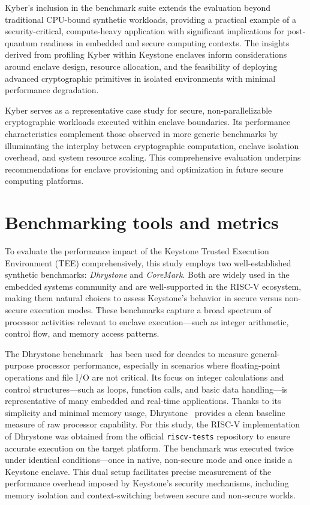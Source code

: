 Kyber’s inclusion in the benchmark suite extends the evaluation beyond traditional CPU-bound synthetic workloads, providing a practical example of a security-critical, compute-heavy application with significant implications for post-quantum readiness in embedded and secure computing contexts. The insights derived from profiling Kyber within Keystone enclaves inform considerations around enclave design, resource allocation, and the feasibility of deploying advanced cryptographic primitives in isolated environments with minimal performance degradation.

Kyber serves as a representative case study for secure, non-parallelizable cryptographic workloads executed within enclave boundaries. Its performance characteristics complement those observed in more generic benchmarks by illuminating the interplay between cryptographic computation, enclave isolation overhead, and system resource scaling. This comprehensive evaluation underpins recommendations for enclave provisioning and optimization in future secure computing platforms.


\section{Benchmarking tools and metrics}
\label{sec:benchmarking-tools}

To evaluate the performance impact of the Keystone Trusted Execution Environment (TEE) comprehensively, this study employs two well-established synthetic benchmarks: \textit{Dhrystone} and \textit{CoreMark}. Both are widely used in the embedded systems community and are well-supported in the RISC-V ecosystem, making them natural choices to assess Keystone’s behavior in secure versus non-secure execution modes. These benchmarks capture a broad spectrum of processor activities relevant to enclave execution—such as integer arithmetic, control flow, and memory access patterns.

The Dhrystone benchmark~\cite{weiss2002dhrystone} has been used for decades to measure general-purpose processor performance, especially in scenarios where floating-point operations and file I/O are not critical. Its focus on integer calculations and control structures—such as loops, function calls, and basic data handling—is representative of many embedded and real-time applications. Thanks to its simplicity and minimal memory usage, Dhrystone~\cite{weiss2002dhrystone} provides a clean baseline measure of raw processor capability. For this study, the RISC-V implementation of Dhrystone was obtained from the official \texttt{riscv-tests} repository to ensure accurate execution on the target platform. The benchmark was executed twice under identical conditions—once in native, non-secure mode and once inside a Keystone enclave. This dual setup facilitates precise measurement of the performance overhead imposed by Keystone’s security mechanisms, including memory isolation and context-switching between secure and non-secure worlds.

